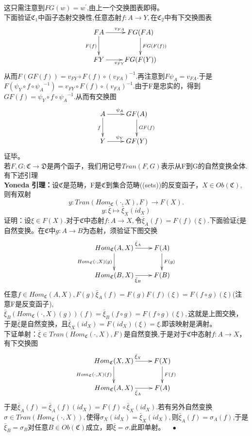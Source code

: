 \documentclass[UTF8]{article}
\begin{document}
这只需注意到$FG(w)=w^{'}$,由上一个交换图表即得。\\
下面验证$\mathfrak{C}_{1}$中函子态射交换性,任意态射$f:A\rightarrow Y,$在$\mathfrak{C}_{2}$中有下交换图表
$$
\xymatrix{
FA\ar[r]^{v_{FA}}\ar[d]_{F(f)}&FG(FA)\ar[d]^{FG(F(f))}\\
FY\ar[r]_{v_{FY}}&FG(F(Y))
}
$$
从而$F(GF(f))=v_{FY}\circ F(f)\circ (v_{FA})^{-1}.$再注意到$F\psi_{A}=v_{FA}.$于是$F(\psi_{Y}\circ f\circ {\psi_{A}}^{-1})=v_{FY}\circ F(f)\circ (v_{FA})^{-1}.$由于F是忠实的，得到$GF(f)=\psi_{Y}\circ f\circ {\psi_{A}}^{-1}$.从而有交换图
$$
\xymatrix{A\ar[r]^{\psi_{A}}\ar[d]_{f} &GF(A)\ar[d]^{GF(f)}\\
Y\ar[r]^{\psi_{Y}}&GF(Y)   }
$$
证毕。\\
若$F,G:\mathfrak{C}\rightarrow \mathfrak{D}$是两个函子，我们用记号$Tran(F,G)$表示从F到G的自然变换全体.有下述引理\\
\textbf{Yoneda 引理：}设$\mathfrak{C}$是范畴，F是$\mathfrak{C}$到集合范畴((sets))的反变函子，$X\in Ob(\mathfrak{C})$,则有双射$$
y:Tran(Hom_{\mathfrak{C}}(\cdot,X),F)\rightarrow F(X).
$$
$$
y:\bar{\xi}\mapsto \bar{\xi}_{X}(id_{X})
$$
证明：设$\xi\in F(X).$对于$\mathfrak{C}$中态射$f:A\rightarrow X,$令$\bar{\xi}_{A}(f)=F(f)(\xi).$下面验证$\bar{\xi}$是自然变换。在$\mathfrak{C}$中$g:A\rightarrow B$为态射，须验证下图交换
$$
\xymatrix{Hom_{\mathfrak{C}}(A,X)\ar[r]^{\bar{\xi}_{A}}\ar[d]_{Hom_{\mathfrak{C}}(\cdot,X)(g)}&F(A)\ar[d]^{F(g)}\\
	Hom_{\mathfrak{C}}(B,X)\ar[r]_{\bar{\xi}_{B}}&F(B)
}
$$
任意$f\in Hom_{\mathfrak{C}}(A,X),F(g)\bar{\xi}_{A}(f)=F(g)F(f)(\xi)=F(f\circ g)(\xi)$(注意F是反变函子),\\
$\bar{\xi}_{B}(Hom_{\mathfrak{C}}(\cdot,X)(g))(f)=\bar{\xi}_{B}(f\circ g)=F(f\circ g)(\xi),$这就是上图交换，于是$\bar{\xi}$是自然变换，且$\bar{\xi}_{X}(id_{X})=F(id_{X})(\xi)=\xi.$即该映射是满射。\\
下证单射：$\bar{\xi}\in Tran(Hom_{\mathfrak{C}}(\cdot,X),F)$是自然变换,于是对于$\mathfrak{C}$中态射$f:A\rightarrow X$，有下交换图
$$
\xymatrix{Hom_{\mathfrak{C}}(X,X)\ar[r]^{\bar{\xi}_{X}}\ar[d]_{Hom_{\mathfrak{C}}(\cdot,X)(f)}&F(X)\ar[d]^{F(f)}\\
	Hom_{\mathfrak{C}}(A,X)\ar[r]_{\bar{\xi}_{A}}&F(A)}
$$
于是$\bar{\xi}_{A}(f)=\bar{\xi}_{A}(f)(id_{X})=F(f)\circ \bar{\xi}_{X}(id_{X}).$若有另外自然变换$\sigma\in Tran(Hom_{\mathfrak{C}}(\cdot,X)),$使得$\sigma_{X}(id_{X})=\bar{\xi}_{X}(id_{X}),$则$\bar{\xi}_{A}(f)=\sigma_{A}(f)$,于是$\bar{\xi}_{B}=\sigma_{B}$对任意$B\in Ob(\mathfrak{C})$成立，即$\bar{\xi}=\sigma .$此即单射。$\quad \bullet$\\
\end{document}
